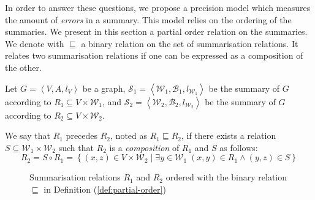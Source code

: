 In order to answer these questions, we propose a precision model which measures the amount of \emph{errors} in a summary. This model relies on the ordering of the summaries. We present in this section a partial order relation on the summaries.\\


We denote with $\sqsubseteq$ a binary relation on the set of summarisation relations. It relates two summarisation relations if one can be expressed as a composition of the other.

\begin{definition}
	Let $G=\left\langle V, A, l_V \right\rangle$ be a graph, $\mathcal{S}_1 = \left\langle \mathcal{W}_1, \mathcal{B}_1, l_{\mathcal{W}_1} \right\rangle$ be the summary of $G$ according to $R_1 \subseteq V \times \mathcal{W}_1$, and $\mathcal{S}_2 = \left\langle \mathcal{W}_2, \mathcal{B}_2, l_{\mathcal{W}_2} \right\rangle$ be the summary of $G$ according to $R_2 \subseteq V \times \mathcal{W}_2$.

	We say that $R_1$ precedes $R_2$, noted as $R_1 \sqsubseteq R_2$, if there exists a relation $S \subseteq \mathcal{W}_1 \times \mathcal{W}_2$ such that $R_2$ is a \emph{composition} of $R_1$ and $S$ as follows:
	$$
	R_2 = S \circ R_1 = \left\lbrace (x, z) \in V \times \mathcal{W}_2 \mid \exists y \in \mathcal{W}_1\; (x, y) \in R_1 \wedge (y, z) \in S \right\rbrace
	$$
	\label{def:partial-order}
\end{definition}

\begin{figure}
	\centering
	\resizebox{.6\textwidth}{!}{
		
	}
	\caption{Summarisation relations $R_1$ and $R_2$ ordered with the binary relation $\sqsubseteq$ in Definition (\ref{def:partial-order})}
	\label{fig:partial-order}
\end{figure}

